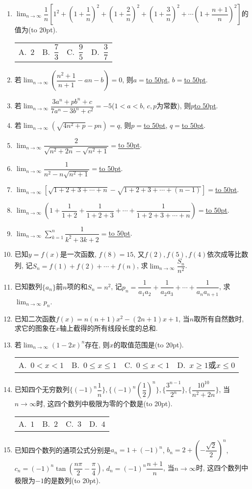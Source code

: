 \documentclass[10pt,a4paper]{article}
\newcommand{\blank}[1]{\underline{\hbox to #1pt{}}}
\newcommand{\bracket}[1]{(\hbox to #1pt{})}
\newcommand{\fourch}[4]{\par\begin{tabular}{p{.23\textwidth}p{.23\textwidth}p{.23\textwidth}p{.23\textwidth}}
A.~#1 &B.~#2& C.~#3& D.~#4
\end{tabular}}
\begin{document}
\begin{enumerate}[1.]
\fourch{$-7$}{$-4$}{$0$}{$4$}
\item $\displaystyle \lim_{n\to \infty} \dfrac 1n[1^2+(1+\dfrac 1n)^2+(1+\dfrac 2n)^2+(1+\dfrac 3n)^2+\cdots (1+\dfrac{n+1}n)^2]$的值为\bracket{20}.
\fourch{$2$}{$\dfrac 73$}{$\dfrac 95$}{$\dfrac 37$}
\item 若$\displaystyle \lim_{n\to \infty} (\dfrac{n^2+1}{n+1}-an-b)=0$, 则$a=$\blank{50}, $b=$\blank{50}.
\item 若$\displaystyle \lim_{n\to \infty} \dfrac{3{a^n}+p{b^n}+c}{7{a^n}-3{b^n}+{c^2}}=-5$($1<a<b$, $c,p$为常数), 则$p$\blank{50}.
\item 若$\displaystyle \lim_{n\to \infty} (\sqrt {4n^2+p}-pn)=q$, 则$p=$\blank{50}, $q=$\blank{50}.
\item $\displaystyle \lim_{n\to \infty} \dfrac 2{\sqrt {n^2+2n}-\sqrt {n^2+1}}=$\blank{50}.
\item $\displaystyle \lim_{n\to \infty} \dfrac 1{n^2-n\sqrt {n^2+1}}=$\blank{50}.
\item $\displaystyle \lim_{n\to \infty} [\sqrt {1+2+3+\cdots +n}-\sqrt {1+2+3+\cdots +(n-1)}]=$\blank{50}.
\item $\displaystyle \lim_{n\to \infty} (1+\dfrac 1{1+2}+\dfrac 1{1+2+3}+\cdots +\dfrac 1{1+2+3+\cdots +n})=$\blank{50}.
\item $\displaystyle \lim_{n\to \infty} \sum\limits_{k=1}^n\dfrac 1{k^2+3k+2}=$\blank{50}.
\item 已知$y=f(x)$是一次函数, $f(8)=15$, 又$f(2),f(5),f(4)$依次成等比数列, 记$S_n=f(1)+f(2)+\cdots +f(n)$, 求$\displaystyle \lim_{n\to \infty} \dfrac{S_n}{n^2}$.
\item 已知数列$\{a_n\}$前$n$项的和$S_n=n^2$, 记$p_n=\dfrac 1{a_1a_2}+\dfrac 1{a_2a_3}+\cdots +\dfrac 1{a_na_{n+1}}$, 求$\displaystyle \lim_{n\to \infty} p_n$.
\item 已知二次函数$f(x)=n(n+1)x^2-(2n+1)x+1$, 当$n$取所有自然数时, 求它的图象在$x$轴上截得的所有线段长度的总和.
\item 若$\displaystyle \lim_{n\to \infty} (1-2x)^n$存在, 则$x$的取值范围是\bracket{20}.
\fourch{$0<x<1$}{$0\le x\le 1$}{$0\le x<1$}{$x\ge 1$或$x\le 0$}
\item 已知四个无穷数列$\{(-1)^n\dfrac 1n\},\{(-1)^n(\dfrac 12)^n\},\{\dfrac{{3^{n-1}}}{2^n}\},\{\dfrac{{{10}^{10}}}{{n^2}+2n}\}$, 当$n\to \infty$时, 这四个数列中极限为零的个数是\bracket{20}.
\fourch{$1$}{$2$}{$3$}{$4$}
\item 已知四个数列的通项公式分别是$a_n=1+(-1)^n$, $b_n=2+(-\dfrac{\sqrt 2}2)^n$, $c_n=(-1)^n\tan (\dfrac{n\pi }2-\dfrac{\pi }4)$, $d_n=(-1)^n\dfrac{n+1}n$, 当$n\to \infty$时, 这四个数列中极限为$-1$的是数列\bracket{20}.

\end{enumerate}
\end{document}
